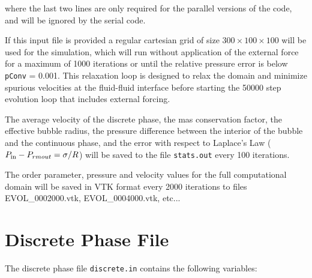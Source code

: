 \documentclass[12pt]{report}
\begin{document}

where the last two lines are only required for the parallel versions of the code, and will be ignored by the serial code.

If this input file is provided a regular cartesian grid of size $300\times100\times100$ will be used for the simulation, which will run without application of the external force for a maximum of 1000 iterations or until the relative pressure error is below \verb+pConv+ = 0.001. This relaxation loop is designed to relax the domain and minimize spurious velocities at the fluid-fluid interface before starting the 50000 step evolution loop that includes external forcing. 

The average velocity of the discrete phase, the mas conservation factor, the effective bubble radius, the pressure difference between the interior of the bubble and the continuous phase, and the error with respect to Laplace's Law ($P_{\rm in} - P_{rm out} = \sigma/R$) will be saved to the file \verb+stats.out+ every 100 iterations.

The order parameter, pressure and velocity values for the full computational domain will be saved in VTK format every 2000 iterations to files EVOL\_0002000.vtk, EVOL\_0004000.vtk, etc...

\section{Discrete Phase File}
The discrete phase file \verb+discrete.in+ contains the following variables:
\end{document}
